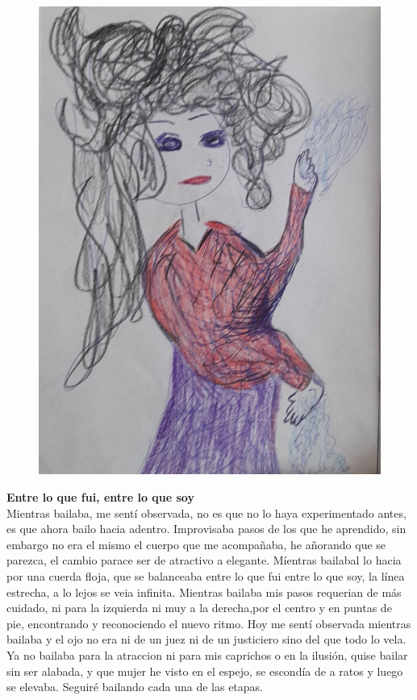 \documentclass[12pt, a4paper, twoside]{book} %
\begin{document}
\begin{figure}[H]
	\centering
	\includegraphics[width=\textwidth]{./images/1f81324df206df.jpg}
\end{figure}

\clearpage

\noindent\textbf{Entre lo que fui, entre lo que soy}\\
Mientras bailaba, me sentí observada, no es que no lo haya experimentado antes, es que ahora bailo hacia adentro.
Improvisaba pasos de los que he aprendido, sin embargo no era el mismo el cuerpo que me acompañaba, he añorando que se parezca, el cambio parace ser de atractivo a elegante.
Míentras bailabal lo hacia por una cuerda floja, que se balanceaba entre lo que fui entre lo que soy, la línea estrecha, a lo lejos se veia  infinita.
Mientras bailaba mis pasos requerian de más cuidado, ni para la izquierda ni muy a la derecha,por el centro y en puntas de pie, encontrando y reconociendo el nuevo ritmo.
Hoy me sentí observada mientras bailaba y el ojo no era ni de un juez ni de un justiciero sino del que todo lo vela.
Ya no bailaba para la atraccion ni para mis caprichos o en la ilusión, quise bailar sin ser alabada, y que mujer he visto en el espejo, se escondía de a ratos y luego se elevaba.
Seguiré bailando cada una de las etapas.
\end{document}
